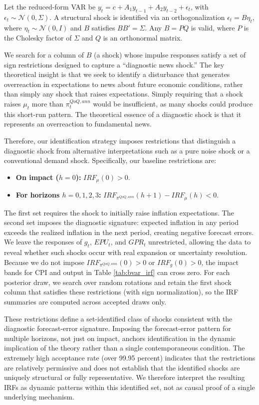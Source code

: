 \documentclass[12pt]{article}
\begin{document}
Let the reduced-form VAR be $y_t = c + A_1 y_{t-1} + A_2 y_{t-2} + \epsilon_t$, with $\epsilon_t \sim \mathcal{N}(0, \Sigma)$. A structural shock is identified via an orthogonalization $\epsilon_t = B \eta_t$, where $\eta_t \sim \mathcal{N}(0, I)$ and $B$ satisfies $BB' = \Sigma$. Any $B = P Q$ is valid, where $P$ is the Cholesky factor of $\Sigma$ and $Q$ is an orthonormal matrix.

We search for a column of $B$ (a shock) whose impulse responses satisfy a set of sign restrictions designed to capture a ``diagnostic news shock.'' The key theoretical insight is that we seek to identify a disturbance that generates overreaction in expectations to news about future economic conditions, rather than simply any shock that raises expectations. Simply requiring that a shock raises $\mu_t$ more than $\pi^{QoQ,ann}_t$ would be insufficient, as many shocks could produce this short-run pattern. The theoretical essence of a diagnostic shock is that it represents an overreaction to fundamental news.

Therefore, our identification strategy imposes restrictions that distinguish a diagnostic shock from alternative interpretations such as a pure noise shock or a conventional demand shock. Specifically, our baseline restrictions are:
\begin{itemize}
    \item \textbf{On impact ($h=0$):} $IRF_{\mu}(0) > 0$.
    \item \textbf{For horizons $h = 0, 1, 2, 3$:} $IRF_{\pi^{QoQ,ann}}(h+1) - IRF_{\mu}(h) < 0$.
\end{itemize}

The first set requires the shock to initially raise inflation expectations. The second set imposes the diagnostic signature: expected inflation in any period exceeds the realized inflation in the next period, creating negative forecast errors. We leave the responses of $g_t$, $EPU_t$, and $GPR_t$ unrestricted, allowing the data to reveal whether such shocks occur with real expansion or uncertainty resolution. Because we do not impose $IRF_{\pi^{QoQ,ann}}(0)>0$ or $IRF_g(0)>0$, the impact bands for CPI and output in Table \ref{tab:bvar_irf} can cross zero. For each posterior draw, we search over random rotations and retain the first shock column that satisfies these restrictions (with sign normalization), so the IRF summaries are computed across accepted draws only.

These restrictions define a set-identified class of shocks consistent with the diagnostic forecast-error signature. Imposing the forecast-error pattern for multiple horizons, not just on impact, anchors identification in the dynamic implication of the theory rather than a single contemporaneous condition. The extremely high acceptance rate (over 99.95 percent) indicates that the restrictions are relatively permissive and does not establish that the identified shocks are uniquely structural or fully representative. We therefore interpret the resulting IRFs as dynamic patterns within this identified set, not as causal proof of a single underlying mechanism.

\end{document}
